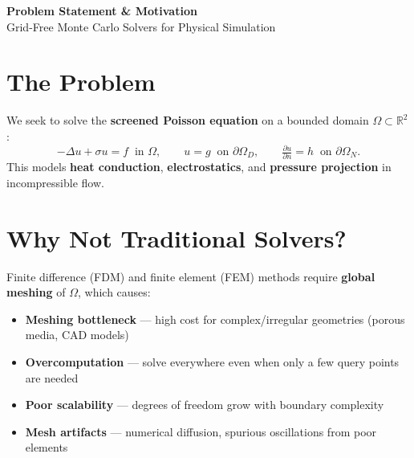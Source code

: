 \documentclass[11pt]{article}
\newcommand{\R}{\mathbb{R}}
\begin{document}
\begin{center}
  {\LARGE\bfseries\color{accent} Problem Statement \& Motivation}\\[4pt]
  {\large Grid-Free Monte Carlo Solvers for Physical Simulation}
\end{center}

\vspace{8pt}

\section{The Problem}

\begin{tcolorbox}[colback=lightbg,colframe=accent,boxrule=0.5pt,arc=2pt,left=6pt,right=6pt,top=4pt,bottom=4pt]
We seek to solve the \textbf{screened Poisson equation} on a bounded domain $\Omega \subset \R^2$:
\[
  -\Delta u + \sigma u = f \;\;\text{in } \Omega, \qquad
  u = g \;\;\text{on } \partial\Omega_D, \qquad
  \tfrac{\partial u}{\partial n} = h \;\;\text{on } \partial\Omega_N.
\]
This models \textbf{heat conduction}, \textbf{electrostatics}, and \textbf{pressure projection} in incompressible flow.
\end{tcolorbox}

\section{Why Not Traditional Solvers?}

Finite difference (FDM) and finite element (FEM) methods require \textbf{global meshing} of $\Omega$, which causes:

\begin{itemize}
  \item \textbf{Meshing bottleneck} --- high cost for complex/irregular geometries (porous media, CAD models)
  \item \textbf{Overcomputation} --- solve everywhere even when only a few query points are needed
  \item \textbf{Poor scalability} --- degrees of freedom grow with boundary complexity
  \item \textbf{Mesh artifacts} --- numerical diffusion, spurious oscillations from poor elements
\end{itemize}
\end{document}
